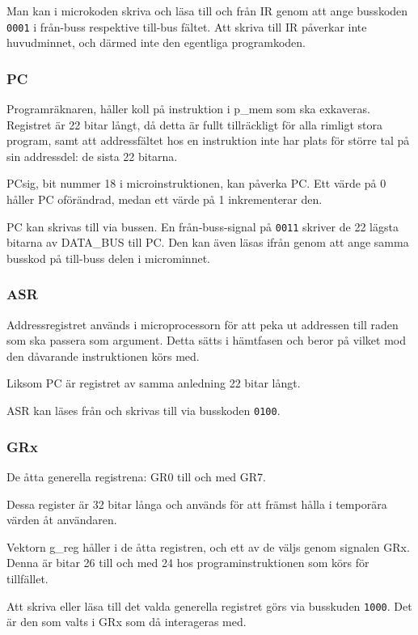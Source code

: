 \documentclass[]{article}
\begin{document}
Man kan i microkoden skriva och läsa till och från IR genom att ange busskoden \texttt{0001} i från-buss respektive till-bus fältet. Att skriva till IR påverkar inte huvudminnet, och därmed inte den egentliga programkoden.

\subsubsection{PC}

Programräknaren, håller koll på instruktion i p\_mem som ska exkaveras. Registret är 22 bitar långt, då detta är fullt tillräckligt för alla rimligt stora program, samt att addressfältet hos en instruktion inte har plats för större tal på sin addressdel: de sista 22 bitarna.

PCsig, bit nummer 18 i microinstruktionen, kan påverka PC. Ett värde på 0 håller PC oförändrad, medan ett värde på 1 inkrementerar den.

PC kan skrivas till via bussen. En från-buss-signal på \texttt{0011} skriver de 22 lägsta bitarna av DATA\_BUS till PC. Den kan även läsas ifrån genom att ange samma busskod på till-buss delen i microminnet.

\subsubsection{ASR}

Addressregistret används i microprocessorn för att peka ut addressen till raden som ska passera som argument. Detta sätts i hämtfasen och beror på vilket mod den dåvarande instruktionen körs med.

Liksom PC är registret av samma anledning 22 bitar långt.

ASR kan läses från och skrivas till via busskoden \texttt{0100}.

\subsubsection{GRx}

De åtta generella registrena: GR0 till och med GR7.

Dessa register är 32 bitar långa och används för att främst hålla i temporära värden åt användaren.

Vektorn g\_reg håller i de åtta registren, och ett av de väljs genom signalen GRx. Denna är bitar 26 till och med 24 hos programinstruktionen som körs för tillfället.

Att skriva eller läsa till det valda generella registret görs via busskuden \texttt{1000}. Det är den som valts i GRx som då interageras med. 
\end{document}
